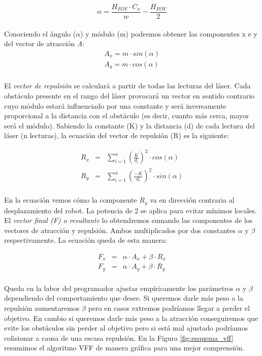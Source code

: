 \begin{equation*}
\alpha = \frac{H_{FOV} \cdot C_{x}}{w} - \frac{H_{FOV}}{2}
\end{equation*}\\

Conociendo el ángulo ($\alpha$) y módulo (m) podremos obtener las componentes x e y del vector de atracción \textit{A}:
\begin{eqnarray*}
A_x = m \cdot sin(\alpha)\\
A_y = m \cdot cos(\alpha)\\
\end{eqnarray*}

El \textit{vector de repulsión} se calculará a partir de todas las lecturas del láser. Cada obstáculo presente en el rango del láser provocará un vector en sentido contrario cuyo módulo estará influenciado por una constante y será inversamente proporcional a la distancia con el obstáculo (es decir, cuanto más cerca, mayor será el módulo). Sabiendo la constante (K) y la distancia (d) de cada lectura del láser (n lecturas), la ecuación del vector de repulsión (R) es la siguiente:

\begin{eqnarray*}
R_x &=& \sum_{i=1}^n\left(\frac{K}{d_i}\right)^2 \cdot cos(\alpha)\\
R_y &=& \sum_{i=1}^n\left(\frac{-K}{d_i}\right)^2 \cdot sin(\alpha)\\
\end{eqnarray*}

En la ecuación vemos cómo la componente $R_y$ va en dirección contraria al desplazamiento del robot. La potencia de 2 se aplica para evitar mínimos locales.\\

El \textit{vector final (F) o resultante} lo obtendremos sumando las componentes de los vectores de atracción y repulsión. Ambos multiplicados por dos constantes $\alpha$ y $\beta$ respectivamente. La ecuación queda de esta manera:

\begin{eqnarray*}
F_x &=& \alpha \cdot A_x + \beta \cdot R_x\\
F_y &=& \alpha \cdot A_y + \beta \cdot R_y\\
\end{eqnarray*}

Queda en la labor del programador ajustar empíricamente los parámetros $\alpha$ y $\beta$ dependiendo del comportamiento que desee. Si queremos darle más peso a la repulsión aumentaremos $\beta$ pero en casos extremos podríamos llegar a perder el objetivo. En cambio si queremos darle más peso a la atracción conseguiremos que evite los obstáculos sin perder al objetivo pero si está mal ajustado podríamos colisionar a causa de una escasa repulsión. En la Figura \ref{fig:esquema_vff} resumimos el algoritmo VFF de manera gráfica para una mejor comprensión.\\

